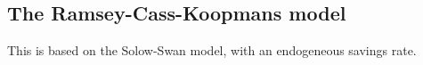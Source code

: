 
\subsection{The Ramsey-Cass-Koopmans model}

This is based on the Solow-Swan model, with an endogeneous savings rate.

